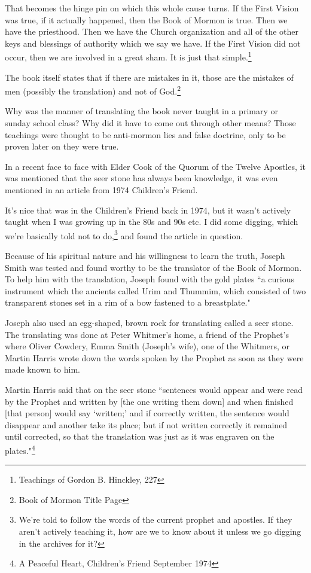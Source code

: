 \begin{displayquote}
That becomes the hinge pin on which this whole cause turns. If the First Vision 
was true, if it actually happened, then the Book of Mormon is true. Then we have 
the priesthood. Then we have the Church organization and all of the other keys 
and blessings of authority which we say we have. If the First Vision did not 
occur, then we are involved in a great sham. It is just that 
simple.\footnote{Teachings of Gordon B. Hinckley, 227}
\end{displayquote}

The book itself states that if there are mistakes in it, those are the mistakes of
men (possibly the translation) and not of God.\footnote{Book of Mormon Title Page}

Why was the manner of translating the book never taught in a primary or sunday school
class? Why did it have to come out through other means? Those teachings were thought
to be anti-mormon lies and false doctrine, only to be proven later on they were true.

In a recent face to face with Elder Cook of the Quorum of the Twelve Apostles, it was
mentioned that the seer stone has always been knowledge, it was even mentioned in an
article from 1974 Children's Friend.

It's nice that was in the Children's Friend back in 1974, but it wasn't actively
taught when I was growing up in the 80s and 90s etc. I did some digging, which we're
basically told not to do,\footnote{We're told to follow the words of the current 
prophet and apostles. If they aren't actively teaching it, how are we to know about 
it unless we go digging in the archives for it?} and found the article in question.

\begin{displayquote}
Because of his spiritual nature and his willingness to learn the truth, Joseph Smith 
was tested and found worthy to be the translator of the Book of Mormon. To help him 
with the translation, Joseph found with the gold plates ``a curious instrument which 
the ancients called Urim and Thummim, which consisted of two transparent stones set 
in a rim of a bow fastened to a breastplate."

Joseph also used an egg-shaped, brown rock for translating called a seer stone. The 
translating was done at Peter Whitmer's home, a friend of the Prophet's where Oliver 
Cowdery, Emma Smith (Joseph’s wife), one of the Whitmers, or Martin Harris wrote down 
the words spoken by the Prophet as soon as they were made known to him.

Martin Harris said that on the seer stone ``sentences would appear and were read by 
the Prophet and written by [the one writing them down] and when finished [that 
person] would say `written;' and if correctly written, the sentence would disappear 
and another take its place; but if not written correctly it remained until corrected, 
so that the translation was just as it was engraven on the 
plates."\footnote{A Peaceful Heart, Children's Friend September 1974}
\end{displayquote}

